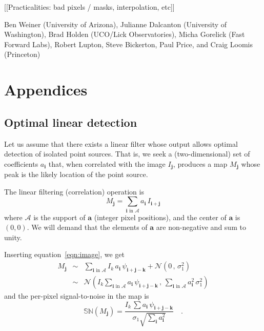 \documentclass[letterpaper,preprint]{aastex62}
\newcommand{\equationname}{equation}
\newcommand{\eqnref}[1]{\mbox{\equationname~\ref{#1}}}
\newcommand{\drawnfrom}{\sim}
\newcommand{\gaussianN}{\mathcal{N}}
\newcommand{\gaussx}[2]{\gaussianN\!\left(#1 \, , \, #2\right)}
\newcommand{\psf}{\psi}
\newcommand{\psfat}[1]{\psf_{#1}}
\newcommand{\signoise}{[S/N]}
\newcommand{\snr}[1]{\mathbb{SN}(#1)}
\renewcommand{\vec}[1]{\boldsymbol{#1}}
\newcommand{\avec}{\vec{a}}
\newcommand{\ivec}{\vec{i}}
\newcommand{\jvec}{\vec{j}}
\newcommand{\kvec}{\vec{k}}
\newcommand{\coord}[2]{(#1, #2)}
\newcommand{\iina}{\ivec \,\, \mathrm{in} \,\, \mathcal{A}}
\begin{document}
[[Practicalities: bad pixels / masks, interpolation, etc]]

\acknowledgements

Ben Weiner (University of Arizona),
Julianne Dalcanton (University of Washington),
Brad Holden (UCO/Lick Observatories),
Micha Gorelick (Fast Forward Labs),
Robert Lupton, Steve Bickerton, Paul Price, and Craig Loomis (Princeton)


%





\appendix

\section{Appendices}

\subsection{Optimal linear detection}
\label{app:lindet}

Let us assume that there exists a linear filter whose output allows
optimal detection of isolated point sources.  That is, we seek a
(two-dimensional) set of coefficients $a_{\ivec}$ that, when
correlated with the image $I_{\jvec}$, produces a map $M_{\jvec}$
whose peak is the likely location of the point source.


The linear filtering (correlation) operation is
\begin{equation}
M_{\jvec} = \sum_{\iina} a_{\ivec} \, I_{\ivec + \jvec}
\label{eq:detmap1}
\end{equation}
where $\mathcal{A}$ is the support of $\avec$ (integer pixel
positions), and the center of $\avec$ is $\coord{0}{0}$.  We will
demand that the elements of $\avec$ are non-negative and sum to unity.

Inserting \eqnref{eqn:image}, we get
\begin{eqnarray}
M_{\jvec} &\drawnfrom& \sum_{\iina}
  I_k \, a_{\ivec} \, \psfat{\ivec + \jvec - \kvec} + \gaussx{0}{\sigma_1^2}
  \\
&\drawnfrom& \gaussx{ I_k \sum_{\iina} a_{\ivec} \, \psfat{\ivec + \jvec - \kvec}}%
    {\sum_{\iina} a_{\ivec}^2 \, \sigma_1^2}
\end{eqnarray}
and the per-pixel signal-to-noise in the map is
\begin{equation}
  \snr{M_{\jvec}} = \frac{I_k \, \sum a_{\ivec} \, \psfat{\ivec + \jvec - \kvec}}{\sigma_1 \sqrt{\sum_{\ivec} a_{\ivec}^2}} \quad .
  \label{eq:detmapsn1}
\end{equation}
\end{document}
